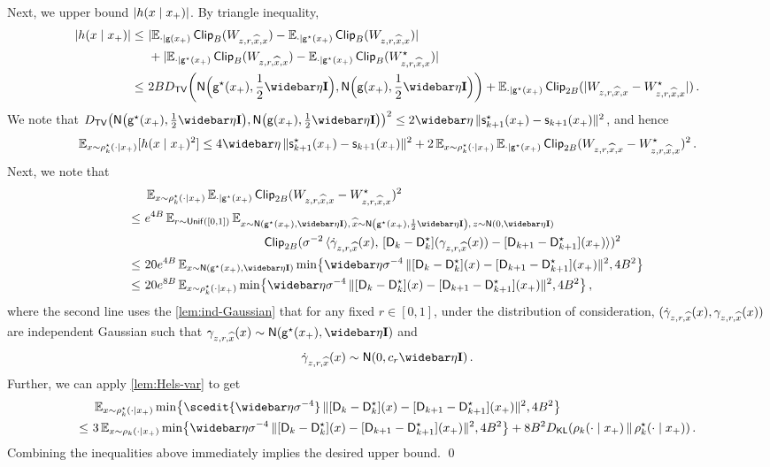 Next, we upper bound $\lvert h(x\mid x_+)\rvert$. By triangle inequality,
\begin{align*}
    \abs{h(x\mid x_+)}
    \leq&~ \abs{\Enxp\pclip{W_{z,r,\xhat,x}}-\Enxps\pclip{W_{z,r,\xhat,x}}} \\
    &~+\abs{\Enxps\pclip{W_{z,r,\xhat,x}}-\Enxps\pclip{\Wstar_{z,r,\xhat,x}}} \\
    \leq&~ 2B\Dtv{\nor\prn[\Big]{\gds(x_+),\frac12\etabar\Id}}{\nor\prn[\Big]{\gd(x_+),\frac12\etabar\Id}}
    + \Enxps\pclip[2B]{\abs{W_{z,r,\xhat,x}-\Wstar_{z,r,\xhat,x}}}\,.
\end{align*}
We note that $\Dtv{\normal{\gds(x_+),\frac12\etabar\Id}}{\normal{\gd(x_+),\frac12\etabar\Id}}^2\leq 2\etabar\, \nrm{\scfs_{k+1}(x_+)-\scf_{k+1}(x_+)}^2$, and hence
\begin{align*}
    \En_{x\sim \rhostar_k(\cdot\mid x_+)}[h(x\mid x_+)^2]
    \leq 4\etabar\, \nrm{\scfs_{k+1}(x_+)-\scf_{k+1}(x_+)}^2
    +2\En_{x\sim \rhostar_k(\cdot\mid x_+)}\Enxps\pclip[2B]{W_{z,r,\xhat,x}-\Wstar_{z,r,\xhat,x}}^2\,.
\end{align*}
Next, we note that
\begin{align*}
    &~ \En_{x\sim \rhostar_k(\cdot\mid x_+)}\Enxps\pclip[2B]{W_{z,r,\xhat,x}-\Wstar_{z,r,\xhat,x}}^2 \\
    \leq &~ e^{4B}\En_{r\sim \unif([0,1])}\En_{x\sim \normal{\gds(x_+),\etabar\Id},\, \xhat\sim \normal{\gds(x_+),\frac12\etabar\Id},\,z\sim \Netabar} \\
    &\qquad\qquad\qquad\qquad\qquad{} \pclip[2B]{\sigma^{-2}\,\langle \dot\gamma_{z,r,\xhat}(x),\, [\Dn_k-\Ds_k](\gamma_{z,r,\xhat}(x)) - [\Dn_{k+1}-\Ds_{k+1}](x_+)\rangle}^2 \\
    \leq&~ 20e^{4B} \En_{x\sim \normal{\gds(x_+),\etabar\Id}} \min\crl*{\etabar\sigma^{-4}\,\nrm{ [\Dn_k-\Ds_k](x) - [\Dn_{k+1}-\Ds_{k+1}](x_+)}^2,4B^2} \\
    \leq&~ 20e^{8B} \En_{x\sim \rhostar_k(\cdot\mid x_+)} \min\crl*{\etabar\sigma^{-4}\,\nrm{ [\Dn_k-\Ds_k](x) - [\Dn_{k+1}-\Ds_{k+1}](x_+)}^2,4B^2}\,,
\end{align*}
where the second line uses the \cref{lem:ind-Gaussian} that for any fixed $r\in[0,1]$, under the distribution of consideration, $(\dot\gamma_{z,r,\widehat{x}}(x),\gamma_{z,r,\widehat{x}}(x))$ are independent Gaussian such that $\gamma_{z,r,\xhat}(x)\sim \normal{\gds(x_+),\etabar\Id}$ and
\begin{align*}
    \dot\gamma_{z,r,\xhat}(x)\sim \normal{0,c_r\etabar\Id}\,.
\end{align*}
Further, we can apply \cref{lem:Hels-var} to get
\begin{align*}
    &~\En_{x\sim \rhostar_k(\cdot\mid x_+)} \min\crl*{\scedit{\etabar\sigma^{-4}}\, \nrm{ [\Dn_k-\Ds_k](x) - [\Dn_{k+1}-\Ds_{k+1}](x_+)}^2,4B^2} \\
    \leq&~ 3\En_{x\sim \rho_k(\cdot\mid x_+)} \min\crl*{\etabar\sigma^{-4}\,\nrm{ [\Dn_k-\Ds_k](x) - [\Dn_{k+1}-\Ds_{k+1}](x_+)}^2,4B^2}+8B^2\Dkl{\rho_k(\cdot\mid x_+)}{\rhostar_k(\cdot\mid x_+)}\,.
\end{align*}
Combining the inequalities above immediately implies the desired upper bound.
\qed






